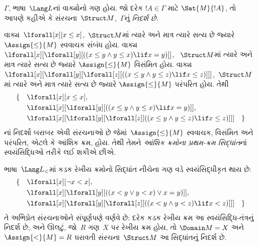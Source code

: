 \begin{defn}[ગણનું નિદર્શ]
$\Gamma$, ભાષા~$\Lang L$નાં વાક્યોનો ગણ હોય. જો દરેક
$!A\in\Gamma$ માટે $\Sat{M}{!A}$, તો આપણે કહીએ કે
સંરચના~$\Struct M$,~$\Gamma$નું \emph{નિદર્શ છે}.
\end{defn}

\begin{ex}
વાક્ય~$\lforall[x][x \le x]$,~$\Struct M$માં ત્યારે અને માત્ર ત્યારે
સત્ય છે જ્યારે $\Assign{\le}{M}$ સ્વવાચક સંબંધ હોય. વાક્ય
$\lforall[x][\lforall[y][((x \le y \land y \le x) \lif x = y)]]$,
~$\Struct M$માં ત્યારે અને માત્ર ત્યારે સત્ય છે જ્યારે
$\Assign{\le}{M}$ વિસંમિત હોય. વાક્ય
$\lforall[x][\lforall[y][\lforall[z][((x \le y \land y \le z)
      \lif x \le z)]]]$,~$\Struct M$માં ત્યારે અને માત્ર ત્યારે સત્ય
છે જ્યારે $\Assign{\le}{M}$ પરંપરિત હોય. તેથી
\begin{align*}
\{\quad &\lforall[x][x \le x], \\
   & \lforall[x][\lforall[y][((x \le y \land y \le
    x) \lif x = y)]], \\
   &\lforall[x][\lforall[y][\lforall[z][((x \le y
      \land y \le z) \lif x \le z)]]] \quad \}
\end{align*}
નાં નિદર્શો બરાબર એવી સંરચનાઓ છે જેમાં~$\Assign{\le}{M}$ સ્વવાચક,
વિસંમિત અને પરંપરિત, એટલે કે આંશિક ક્રમ, હોય. તેથી તેમને
\emph{આંશિક ક્રમોના પ્રથમ-ક્રમ સિદ્ધાંત}નાં સ્વયંસિદ્ધિઓ તરીકે લઈ
શકીએ છીએ.
\end{ex}
\endgroup


\begingroup
\makeatletter{}\makeatother


\label{guunit:OLP-0170}


\begin{ex}
ભાષા~$\Lang L_<$માં કડક રેખીય ક્રમોનો સિદ્ધાંત નીચેના ગણ વડે
સ્વયંસિદ્ધીકૃત થાય છે:
\begin{align*}
\{\quad & \lforall[x][\lnot x < x], \\
& \lforall[x][\lforall[y][((x < y \lor y <
    x) \lor x = y)]], \\
& \lforall[x][\lforall[y][\lforall[z][((x < y
      \land y < z) \lif x < z)]]] \quad \}
\end{align*}
તે અભિપ્રેત સંરચનાઓને સંપૂર્ણપણે વર્ણવે છે: દરેક કડક રેખીય
ક્રમ આ સ્વયંસિદ્ધિ-તંત્રનું નિદર્શ છે; અને ઊલટું, જો~$R$ ગણ~$X$ પર
રેખીય ક્રમ હોય, તો $\Domain M=X$ અને $\Assign{<}{M}=R$ ધરાવતી
સંરચના~$\Struct M$ આ સિદ્ધાંતનું નિદર્શ છે.
\end{ex}

